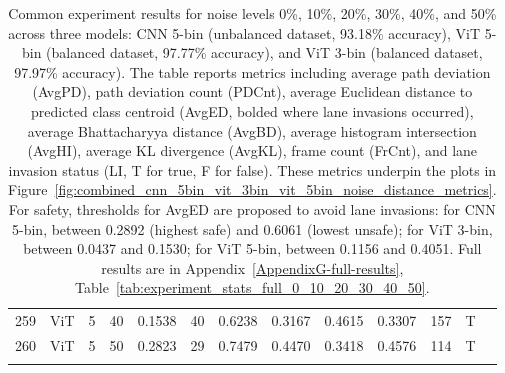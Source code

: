 \begin{longtable}{@{}cllrrrrrrrrrc@{}}
259 & ViT & 5 & 40 & 0.1538 & 40 & 0.6238 & 0.3167 & 0.4615 & 0.3307 & 157 & T \\
260 & ViT & 5 & 50 & 0.2823 & 29 & 0.7479 & 0.4470 & 0.3418 & 0.4576 & 114 & T \\
\bottomrule
\caption{Common experiment results for noise levels 0\%, 10\%, 20\%, 30\%, 40\%, and 50\% across three models: CNN 5-bin (unbalanced dataset, 93.18\% accuracy), ViT 5-bin (balanced dataset, 97.77\% accuracy), and ViT 3-bin (balanced dataset, 97.97\% accuracy). The table reports metrics including average path deviation (AvgPD), path deviation count (PDCnt), average Euclidean distance to predicted class centroid (AvgED, bolded where lane invasions occurred), average Bhattacharyya distance (AvgBD), average histogram intersection (AvgHI), average KL divergence (AvgKL), frame count (FrCnt), and lane invasion status (LI, T for true, F for false). These metrics underpin the plots in Figure~\ref{fig:combined_cnn_5bin_vit_3bin_vit_5bin_noise_distance_metrics}. For safety, thresholds for AvgED are proposed to avoid lane invasions: for CNN 5-bin, between 0.2892 (highest safe) and 0.6061 (lowest unsafe); for ViT 3-bin, between 0.0437 and 0.1530; for ViT 5-bin, between 0.1156 and 0.4051. Full results are in Appendix~\ref{AppendixG-full-results}, Table~\ref{tab:experiment_stats_full_0_10_20_30_40_50}.}
\label{tab:experiment_stats_common_0_10_20_30_40_50}
\label{tab:experiment_stats_common_0_10_20_30_40_50}
\end{longtable}




